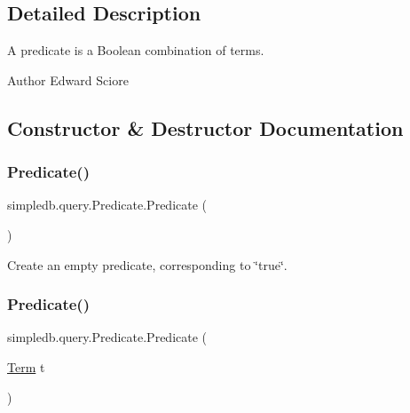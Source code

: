 \subsection{Detailed Description}
A predicate is a Boolean combination of terms. \begin{DoxyAuthor}{Author}
Edward Sciore 
\end{DoxyAuthor}


\subsection{Constructor \& Destructor Documentation}
\mbox{\label{classsimpledb_1_1query_1_1Predicate_aa52f71d773d6c8577f78868eecc30b5d}} 
\subsubsection{\texorpdfstring{Predicate()}{Predicate()}\hspace{0.1cm}{\footnotesize\ttfamily [1/2]}}
{\footnotesize\ttfamily simpledb.\+query.\+Predicate.\+Predicate (\begin{DoxyParamCaption}{ }\end{DoxyParamCaption})\hspace{0.3cm}{\ttfamily [inline]}}

Create an empty predicate, corresponding to \char`\"{}true\char`\"{}. \mbox{\label{classsimpledb_1_1query_1_1Predicate_abf1bd6b991bdbf075da1926957458d04}} 
\subsubsection{\texorpdfstring{Predicate()}{Predicate()}\hspace{0.1cm}{\footnotesize\ttfamily [2/2]}}
{\footnotesize\ttfamily simpledb.\+query.\+Predicate.\+Predicate (\begin{DoxyParamCaption}\item[{\hyperlink{classsimpledb_1_1query_1_1Term}{Term}}]{t }\end{DoxyParamCaption})\hspace{0.3cm}{\ttfamily [inline]}}

